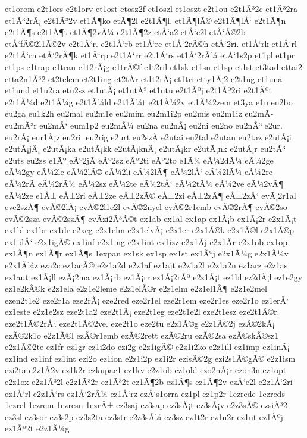 {et1orom
e2t1ors
e2t1orv
et1ost
etosz2f
et1oszl
et1oszt
e2t1ou
e2t1Ã³2c
et1Ã³2ra
et1Ã³2rÃ¡
e2t1Ã³2v
et1Ã¶ko
etÃ¶2l
e2t1Ã¶l.
et1Ã¶lÃ©
e2t1Ã¶lÅ‘
e2t1Ã¶n
e2t1Ã¶s
e2t1Ã¶t
et1Ã¶2vÃ¼
e2t1Ã¶2z
etÅ‘a2
etÅ‘e2l
etÅ‘Ã©2b
etÅ‘fÃ©2l1Ã©2v
e2t1Å‘r.
e2t1Å‘rb
et1Å‘rc
et1Å‘2rÃ©h
etÅ‘2ri.
et1Å‘rk
et1Å‘rl
e2t1Å‘rn
etÅ‘2rÃ¶k
et1Å‘rp
e2t1Å‘rr
e2t1Å‘rs
et1Å‘2rÃ¼
etÅ‘1s2p
et1pl
et1pr
et1ps
e1trap
e1trau
e1t2rÃ¡g
e1trÃ©f
e1t2ril
et1sk
et1sn
et1sp
et1st
et3tad
ettai2
etta2n1Ã³2
et2telem
et2t1ing
et2tÃ­r
et1t2rÃ¡
et1tri
etty1Ã¡2
e2t1ug
et1una
et1und
et1u2ra
etu2sz
et1utÃ¡
et1utÃ³
et1utu
e2t1Ãºj
e2t1Ãº2ri
e2t1Ãºt
e2t1Ã¼d
e2t1Ã¼g
e2t1Ã¼ld
e2t1Ã¼t
e2t1Ã¼2v
et1Ã¼2zem
et3ya
e1u
eu2bo
eu2ga
eu1k2h
eu2mal
eu2m1e
eu2mim
eu2m1i2p
eu2mis
eu2m1iz
eu2mÃ­
eu2mÃ³r
eu2mÅ‘
eum1p2
eu2mÃ¼
eu2na
eu2nÃ¡
eu2ni
eu2no
eu2nÃ³
e2ur.
eu2rÃ¡
eur1Ã¡z
eu2ri.
eu2rig
e2urt
eu2szÃ­
e2utai
eu2tal
e2utan
eu2taz
e2utÃ¡i
e2utÃ¡jÃ¡
e2utÃ¡ka
e2utÃ¡kk
e2utÃ¡knÃ¡
e2utÃ¡kr
e2utÃ¡nk
e2utÃ¡r
eu2tÃ³
e2uts
eu2zs
e1Ãº
eÃº2jÃ­
eÃº2sz
eÃº2ti
eÃº2to
e1Ã¼
eÃ¼2dÃ¼
eÃ¼2ge
eÃ¼2gy
eÃ¼2le
eÃ¼2lÃ©
eÃ¼2li
eÃ¼2lÃ¶
eÃ¼2lÅ‘
eÃ¼2lÃ¼
eÃ¼2re
eÃ¼2rÃ­
eÃ¼2rÃ¼
eÃ¼2sz
eÃ¼2te
eÃ¼2tÅ‘
eÃ¼2tÃ¼
eÃ¼2ve
eÃ¼2vÃ¶
eÃ¼2ze
e1Å±
eÅ±2ri
eÅ±2ze
eÅ±2zÃ©
eÅ±2zi
eÅ±2zÃ¶
eÅ±2zÅ‘
evÃ¡2r1al
eve2szÃ¶
evÃ©2lÃ¡
evÃ©2l1e2l
evÃ©2nyel
evÃ©2r1emb
evÃ©2rÃ¶
evÃ©2so
evÃ©2sza
evÃ©2szÃ¶
evÃ­zi2Ã³Ã©t
ex1ab
ex1al
ex1ap
ex1Ã¡b
ex1Ã¡2r
e2x1Ã¡t
ex1bl
ex1br
ex1dr
e2xeg
e2x1elm
e2x1elvÃ¡
e2x1er
e2x1Ã©k
e2x1Ã©l
e2x1Ã©p
ex1idÅ‘
e2x1igÃ©
ex1inf
e2x1ing
e2x1int
ex1izz
e2x1Ã­j
e2x1Ã­r
e2x1ob
ex1op
ex1Ã¶n
ex1Ã¶r
ex1Ã¶s
1expan
ex1sk
ex1sp
ex1st
ex1Ãºj
e2x1Ã¼g
e2x1Ã¼v
e2x1Ã¼z
eza2c
ez1acÃ©
e2z1a2d
e2z1af
ez1ajt
e2z1a2l
e2z1a2n
ez1arz
e2z1as
ez1aut
ez1Ã¡ll
ezÃ¡2ma
ez1Ã¡rb
ez1Ã¡rr
ez1Ã¡2rÃº
e2z1Ã¡t
ez1bl
ez2dÃ¡l
ez1e2gy
ez1e2kÃ©k
e2z1ela
e2z1e2leme
e2z1elÃ©r
e2z1elm
e2z1el1Ã¶
e2z1e2mel
ezen2t1e2
eze2r1a
eze2rÃ¡
eze2red
eze2r1el
eze2r1em
eze2r1es
eze2r1o
ez1erÅ‘
ez1este
e2z1e2sz
eze2t1a2
eze2t1Ã¡
eze2t1eg
eze2t1e2l
eze2t1esz
eze2t1Ã©r.
eze2t1Ã©2rÅ‘.
eze2t1Ã©2ve.
eze2t1o
eze2tu
e2z1Ã©g
e2z1Ã©2j
ezÃ©2kÃ¡
ezÃ©2k1o
e2z1Ã©l
ezÃ©r1emb
ezÃ©2rett
ezÃ©2ru
ezÃ©2sa
ezÃ©skÃ©sz1
e2z1Ã©2te
ez1fr
ez1gr
ez1i2do
ezi2g
e2z1igÃ©
e2z1i2ko
e2z1ill
ez1imp
ez1inÃ¡
ez1ind
ez1inf
ez1int
ezi2o
ez1ion
e2z1i2p
ez1i2r
ezisÃ©2g
ezi2s1Ã©gÃ©
e2z1ism
ezi2ta
e2z1Ã­2v
ez1k2r
ezkupac1
ez1kv
e2z1ob
ez1old
ezo2nÃ¡r
ezon3n
ez1opt
e2z1ox
e2z1Ã³2l
e2z1Ã³2r
ez1Ã³2t
ez1Ã¶2b
ez1Ã¶s
ez1Ã¶2v
ezÅ‘e2l
e2z1Å‘2ri
ez1Å‘rl
e2z1Å‘rs
ez1Å‘2rÃ¼
ez1Å‘rz
ezÅ‘s1orra
ez1pl
ez1p2r
1ezrede
1ezreds
1ezrel
1ezrem
1ezresn
1ezrÅ±
ez3saj
ez3sap
ez3sÃ¡t
ez3sÃ¡v
e2z3sÃ©
ezsiÃ³2
ez3sl
ez3sor
ez3s2p
ez3s2ta
ez3str
e2z3sÃ¼
ez3sz
ez1t2r
ez1u2r
ez1ut
ez1Ãºj
ez1Ãº2t
e2z1Ã¼g
}
